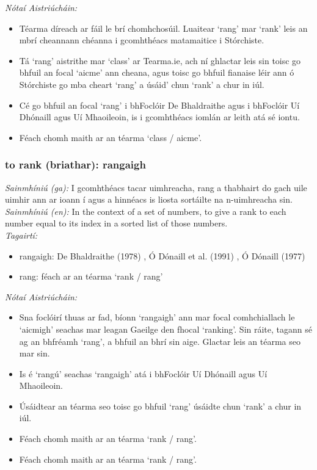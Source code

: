  \noindent \textit{Nótaí Aistriúcháin:}
\begin{itemize}
	\item Téarma díreach ar fáil le brí chomhchosúil. Luaitear `rang' mar `rank' leis an mbrí cheannann chéanna i gcomhthéacs matamaitice i Stórchiste.
	\item Tá `rang' aistrithe mar `class' ar Tearma.ie, ach ní ghlactar leis sin toisc go bhfuil an focal `aicme' ann cheana, agus toisc go bhfuil fianaise léir ann ó Stórchiste go mba cheart `rang' a úsáid' chun `rank' a chur in iúl.
	\item Cé go bhfuil an focal `rang' i bhFoclóir De Bhaldraithe agus i bhFoclóir Uí Dhónaill agus Uí Mhaoileoin, is i gcomhthéacs iomlán ar leith atá sé iontu.
	\item Féach chomh maith ar an téarma `class / aicme'.
\end{itemize}


\subsubsection*{to rank (briathar): rangaigh}
 \noindent \textit{Sainmhíniú (ga):} I gcomhthéacs tacar uimhreacha, rang a thabhairt do gach uile uimhir ann ar ioann í agus a hinnéacs is liosta sortáilte na n-uimhreacha sin.
\\
 \noindent \textit{Sainmhíniú (en):} In the context of a set of numbers, to give a rank to each number equal to its index in a sorted list of those numbers.
\\
 \noindent \textit{Tagairtí:}
\begin{itemize}
	\item rangaigh: De Bhaldraithe (1978) \cite{de-bhaldraithe}, Ó Dónaill et al. (1991) \cite{focloir-beag}, Ó Dónaill (1977) \cite{odonaill}
	\item rang: féach ar an téarma `rank / rang'
\end{itemize}

 \noindent \textit{Nótaí Aistriúcháin:}
\begin{itemize}
	\item Sna foclóirí thuas ar fad, bíonn `rangaigh' ann mar focal comhchiallach le `aicmigh' seachas mar leagan Gaeilge den fhocal `ranking'. Sin ráite, tagann sé ag an bhfréamh `rang', a bhfuil an bhrí sin aige. Glactar leis an téarma seo mar sin.
	\item Is é `rangú' seachas `rangaigh' atá i bhFoclóir Uí Dhónaill agus Uí Mhaoileoin.
	\item Úsáidtear an téarma seo toisc go bhfuil `rang' úsáidte chun `rank' a chur in iúl.
	\item Féach chomh maith ar an téarma `rank / rang'.
	\item Féach chomh maith ar an téarma `rank / rang'.
\end{itemize}


